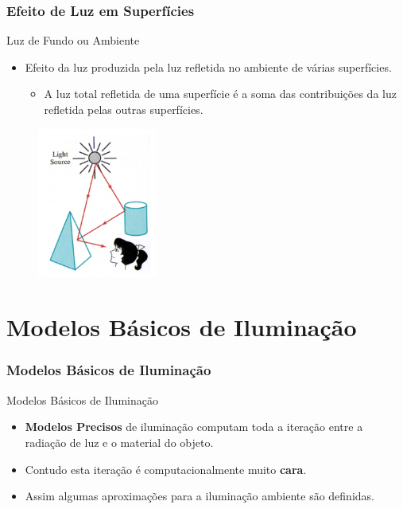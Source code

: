 \documentclass{beamer}
\begin{document}
\begin{frame}
\frametitle{Efeito de Luz em Superfícies}

	\begin{block}{Luz de Fundo ou Ambiente}
		\begin{itemize}
			\item Efeito da luz produzida pela luz refletida no ambiente de várias superfícies.
			\begin{itemize}
				\item A luz total refletida de uma superfície é a soma das contribuições da luz refletida pelas outras superfícies.
			\end{itemize}
		\end{itemize}
	\end{block}
	
	\begin{figure}[!h]
			\begin{center}
			\includegraphics[width=0.35\textwidth]{Figures/LuzAmb}
			\end{center}
		\end{figure}	
	
\end{frame}

\section{Modelos Básicos de Iluminação}
\begin{frame}
\frametitle{Modelos Básicos de Iluminação}

	\begin{block}{Modelos Básicos de Iluminação}
		\begin{itemize}
			\item \textbf{Modelos Precisos} de iluminação computam toda a iteração entre a radiação de luz e o material do objeto.
			\item Contudo esta iteração é computacionalmente muito \textbf{cara}.
			\item Assim algumas aproximações para a iluminação ambiente são definidas.
		\end{itemize}
	\end{block}
	
\end{frame}
\end{document}
